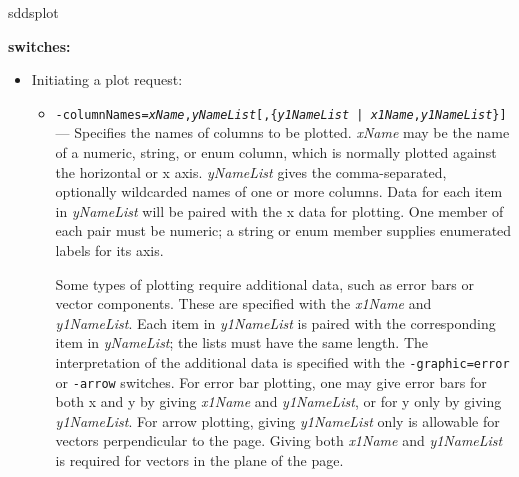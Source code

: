 \begin{sddsprog}{sddsplot}
  \item \textbf{switches:}
\begin{itemize}
\item Initiating a plot request:\\
  \begin{itemize}
  \item {\tt -columnNames={\em xName},{\em yNameList}[,\{{\em y1NameList} | {\em x1Name},{\em y1NameList}\}] }---
        Specifies the names of columns to be plotted.  {\em xName} may be the name of a numeric, string, or enum column,
        which is normally plotted against the horizontal or x axis.
        {\em yNameList} gives the comma-separated, optionally wildcarded names of one or more columns.
        Data for each item in {\em yNameList} will be paired with the x data for plotting.  One member of each
        pair must be numeric; a string or enum member supplies enumerated labels for its axis.

        Some types of plotting require additional data, such as error bars or vector components.  These are
        specified with the {\em x1Name} and {\em y1NameList}.  Each item in {\em y1NameList} is paired with the
        corresponding item in {\em yNameList}; the lists must have the same length.  The interpretation of the
        additional data is specified with the {\tt -graphic=error} or {\tt -arrow} switches. For error bar
        plotting, one may give error bars for both x and y by giving {\em x1Name} and {\em y1NameList}, or for y
        only by giving {\em y1NameList}.  For arrow plotting, giving {\em y1NameList} only is allowable for
        vectors perpendicular to the page. Giving both {\em x1Name} and {\em y1NameList} is required for vectors
        in the plane of the page.


\end{itemize}
\end{itemize}
\end{sddsprog}
